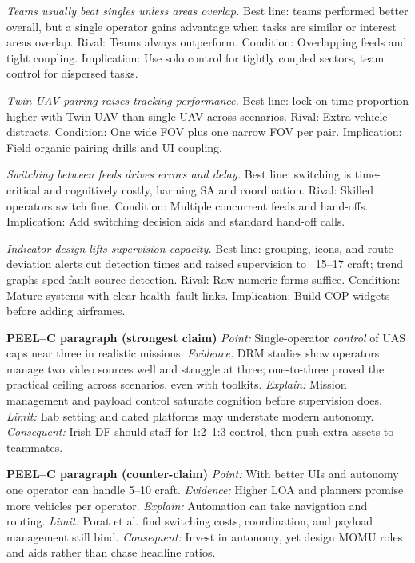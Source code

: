 \textit{Teams usually beat singles unless areas overlap.} Best line: teams performed better overall, but a single operator gains advantage when tasks are similar or interest areas overlap. Rival: Teams always outperform. Condition: Overlapping feeds and tight coupling. Implication: Use solo control for tightly coupled sectors, team control for dispersed tasks.

\textit{Twin-UAV pairing raises tracking performance.} Best line: lock-on time proportion higher with Twin UAV than single UAV across scenarios. Rival: Extra vehicle distracts. Condition: One wide FOV plus one narrow FOV per pair. Implication: Field organic pairing drills and UI coupling.

\textit{Switching between feeds drives errors and delay.} Best line: switching is time-critical and cognitively costly, harming SA and coordination. Rival: Skilled operators switch fine. Condition: Multiple concurrent feeds and hand-offs. Implication: Add switching decision aids and standard hand-off calls.

\textit{Indicator design lifts supervision capacity.} Best line: grouping, icons, and route-deviation alerts cut detection times and raised supervision to ~15–17 craft; trend graphs sped fault-source detection. Rival: Raw numeric forms suffice. Condition: Mature systems with clear health–fault links. Implication: Build COP widgets before adding airframes.

\textbf{PEEL–C paragraph (strongest claim)}
\textit{Point:} Single-operator \emph{control} of UAS caps near three in realistic missions.
\textit{Evidence:} DRM studies show operators manage two video sources well and struggle at three; one-to-three proved the practical ceiling across scenarios, even with toolkits.
\textit{Explain:} Mission management and payload control saturate cognition before supervision does.
\textit{Limit:} Lab setting and dated platforms may understate modern autonomy.
\textit{Consequent:} Irish DF should staff for 1:2–1:3 control, then push extra assets to teammates.

\textbf{PEEL–C paragraph (counter-claim)}
\textit{Point:} With better UIs and autonomy one operator can handle 5–10 craft.
\textit{Evidence:} Higher LOA and planners promise more vehicles per operator.
\textit{Explain:} Automation can take navigation and routing.
\textit{Limit:} Porat et al. find switching costs, coordination, and payload management still bind.
\textit{Consequent:} Invest in autonomy, yet design MOMU roles and aids rather than chase headline ratios.

